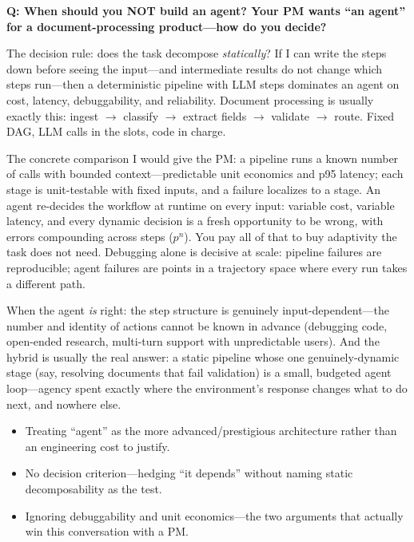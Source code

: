 \begin{interviewq}
\textbf{Q: When should you NOT build an agent? Your PM wants ``an agent'' for a document-processing product---how do you decide?}

 \quad {} \quad \badgefreq{\freqhigh}

\stronganswer

The decision rule: does the task decompose \textit{statically}? If I can write the steps down before seeing the input---and intermediate results do not change which steps run---then a deterministic pipeline with LLM steps dominates an agent on cost, latency, debuggability, and reliability. Document processing is usually exactly this: ingest $\rightarrow$ classify $\rightarrow$ extract fields $\rightarrow$ validate $\rightarrow$ route. Fixed DAG, LLM calls in the slots, code in charge.

The concrete comparison I would give the PM: a pipeline runs a known number of calls with bounded context---predictable unit economics and p95 latency; each stage is unit-testable with fixed inputs, and a failure localizes to a stage. An agent re-decides the workflow at runtime on every input: variable cost, variable latency, and every dynamic decision is a fresh opportunity to be wrong, with errors compounding across steps ($p^n$). You pay all of that to buy adaptivity the task does not need. Debugging alone is decisive at scale: pipeline failures are reproducible; agent failures are points in a trajectory space where every run takes a different path.

When the agent \textit{is} right: the step structure is genuinely input-dependent---the number and identity of actions cannot be known in advance (debugging code, open-ended research, multi-turn support with unpredictable users). And the hybrid is usually the real answer: a static pipeline whose one genuinely-dynamic stage (say, resolving documents that fail validation) is a small, budgeted agent loop---agency spent exactly where the environment's response changes what to do next, and nowhere else.

\redflags
\begin{itemize}
    \item Treating ``agent'' as the more advanced/prestigious architecture rather than an engineering cost to justify.
    \item No decision criterion---hedging ``it depends'' without naming static decomposability as the test.
    \item Ignoring debuggability and unit economics---the two arguments that actually win this conversation with a PM.
\end{itemize}


\end{interviewq}
